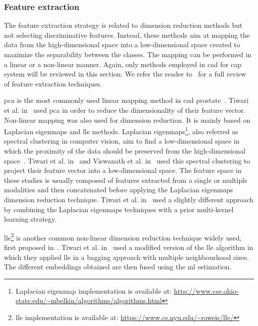 \subsubsection{Feature extraction}

The feature extraction strategy is related to dimension reduction methods but not selecting discriminative features. Instead, these methods aim at mapping the data from the high-dimensional space into a low-dimensional space created to maximize the separability between the classes. The mapping can be performed in a linear or a non-linear manner. Again, only methods employed in \ac{cad} for \ac{cap} system will be reviewed in this section. We refer the reader to~\cite{Fodor2002} for a full review of feature extraction techniques.

\Ac{pca} is the most commonly used linear mapping method in \ac{cad} prostate~\cite{Jolliffe2002}. Tiwari et al. in~\cite{Tiwari2008,Tiwari2009,Tiwari2012} used \ac{pca} in order to reduce the dimensionality of their feature vector.
Non-linear mapping was also used for dimension reduction. It is mainly based on Laplacian eigenmaps and \acf{lle} methods. Laplacian eigenmaps\footnote{Laplacian eigenmap implementation is available at: \url{http://www.cse.ohio-state.edu/~mbelkin/algorithms/algorithms.html}}, also referred as spectral clustering in computer vision, aim to find a low-dimensional space in which the proximity of the data should be preserved from the high-dimensional space~\cite{Shi2000,Belkin2001}. Tiwari et al. in~\cite{Tiwari2007,Tiwari2009,Tiwari2009a} and Viswanath et al. in~\cite{Viswanath2008} used this spectral clustering to project their feature vector into a low-dimensional space. The feature space in these studies is usually composed of features extracted from a single or multiple modalities and then concatenated before applying the Laplacian eigenmaps dimension reduction technique.
Tiwari et al. in~\cite{Tiwari2009,Tiwari2013} used a slightly different approach by combining the Laplacian eigenmaps techniques with a prior multi-kernel learning strategy.

\Ac{lle}\footnote{\ac{lle} implementation is available at: \url{https://www.cs.nyu.edu/~roweis/lle/}} is another common non-linear dimension reduction technique widely used, first proposed in~\cite{Roweis2000}. Tiwari et al. in~\cite{Tiwari2008} used a modified version of the \ac{lle} algorithm in which they applied \ac{lle} in a bagging approach with multiple neighbourhood sizes. The different embeddings obtained are then fused using the \ac{ml} estimation.

